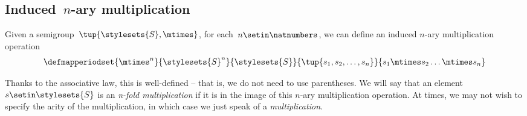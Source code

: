 \subsection{Induced~$n$-ary multiplication}
Given a semigroup~$\tup{\stylesets{S}, \mtimes}$, for each~$n \setin \natnumbers$, we can define an induced $n$-ary multiplication operation
% 
\begin{equation*}
    \defmapperiodset{\mtimes^n}{\stylesets{S}^n}{\stylesets{S}}{\tup{s_1, s_2, \dots, s_n}}{ s_1 \mtimes s_2 \dots \mtimes s_n}
\end{equation*}


Thanks to the associative law, this is well-defined -- that is, we do not need to use parentheses.
We will say that an element~$s \setin \stylesets{S}$ is an \emph{n-fold multiplication} if it is in the image of this $n$-ary multiplication operation.
At times, we may not wish to specify the arity of the multiplication, in which case we just speak of a \emph{multiplication}.

\showslides{
    \begin{forslides}
        \begin{equation}
            \label{eq:sg-mora}
            \mora
        \end{equation}
        \begin{equation}
            \label{eq:sg-morb}
            \morb
        \end{equation}
        \begin{equation}
            \label{eq:sg-morab}
            \mora\then\morb
        \end{equation}
    \end{forslides}
}
